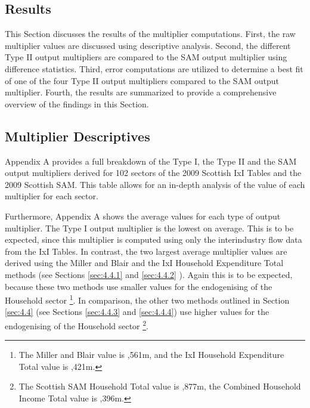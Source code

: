 \begin{doublespacing}

\newpage
    \section{Results}
\label{sec:4.5}

This Section discusses the results of the multiplier computations. First, the raw multiplier values are discussed using descriptive analysis. Second, the different Type II output multipliers are compared to the SAM output multiplier using difference statistics. Third, error computations are utilized to determine a best fit of one of the four Type II output multipliers compared to the SAM output multiplier. Fourth, the results are summarized to provide a comprehensive overview of the findings in this Section.

\subsection{Multiplier Descriptives}
\label{sec:4.5.1}

Appendix A provides a full breakdown of the Type I, the Type II and the SAM output multipliers derived for 102 sectors of the 2009 Scottish IxI Tables and the 2009 Scottish SAM. This table allows for an in-depth analysis of the value of each multiplier for each sector. 

\bigskip

Furthermore, Appendix A shows the average values for each type of output multiplier. The Type I output multiplier is the lowest on average. This is to be expected, since this multiplier is computed using only the interindustry flow data from the IxI Tables. In contrast, the two largest average multiplier values are derived using the Miller and Blair and the IxI Household Expenditure Total methods (see Sections \ref{sec:4.4.1} and \ref{sec:4.4.2} ). Again this is to be expected, because these two methods use smaller values for the endogenising of the Household sector \footnote{The Miller and Blair value is ,561m, and the IxI Household Expenditure Total value is ,421m.}. In comparison, the other two methods outlined in Section \ref{sec:4.4} (see Sections \ref{sec:4.4.3} and \ref{sec:4.4.4}) use higher values for the endogenising of the Household sector \footnote{The Scottish SAM Household Total value is ,877m, the Combined Household Income Total value is ,396m.}. 


\end{doublespacing}
